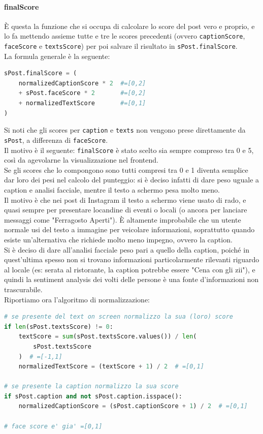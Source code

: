 \paragraph{finalScore} \aCapo
È questa la funzione che si occupa di calcolare lo score del post vero e proprio, e lo fa
mettendo assieme tutte e tre le scores precedenti (ovvero \verb+captionScore+, \verb+faceScore+ e \verb+textsScore+)
per poi salvare il risultato in \verb+sPost.finalScore+.\\
La formula generale è la seguente:
\begin{lstlisting}[language=Python]
sPost.finalScore = (
    normalizedCaptionScore * 2  #=[0,2]
    + sPost.faceScore * 2       #=[0,2]
    + normalizedTextScore       #=[0,1]
)
\end{lstlisting}
Si noti che gli scores per \verb+caption+ e \verb+texts+ non vengono prese direttamente da \verb+sPost+, a differenza
di \verb+faceScore+. \\
Il motivo è il seguente: \verb+finalScore+ è stato scelto sia sempre compreso tra 0 e 5,
così da agevolarne la visualizzazione nel frontend. \\
Se gli scores che lo compongono sono tutti
compresi tra 0 e 1 diventa semplice dar loro dei pesi nel calcolo del punteggio: si è deciso
infatti di dare peso uguale a caption e analisi facciale, mentre il testo a schermo pesa molto meno.\\
Il motivo è che nei post di Instagram il testo a schermo viene usato di rado, e quasi sempre
per presentare locandine di eventi o locali (o ancora per lanciare messaggi come "Ferragosto Aperti").
È altamente improbabile che un utente normale usi del testo a immagine per veicolare informazioni,
soprattutto quando esiste un'alternativa che richiede molto meno impegno, ovvero la caption.\\
Si è deciso di dare all'analisi facciale peso pari a quello della caption, poiché in quest'ultima spesso
non si trovano informazioni particolarmente rilevanti riguardo al locale (es: serata al ristorante,
la caption potrebbe essere "Cena con gli zii"), e quindi la sentiment analysis dei volti delle persone 
è una fonte d'informazioni non trascurabile.\\
Riportiamo ora l'algoritmo di normalizzazione:
\begin{lstlisting}[language=Python]
# se presente del text on screen normalizzo la sua (loro) score
if len(sPost.textsScore) != 0:
    textScore = sum(sPost.textsScore.values()) / len(
        sPost.textsScore
    )  # =[-1,1]
    normalizedTextScore = (textScore + 1) / 2  # =[0,1]

# se presente la caption normalizzo la sua score
if sPost.caption and not sPost.caption.isspace():
    normalizedCaptionScore = (sPost.captionScore + 1) / 2  # =[0,1]

# face score e' gia' =[0,1]
\end{lstlisting}
